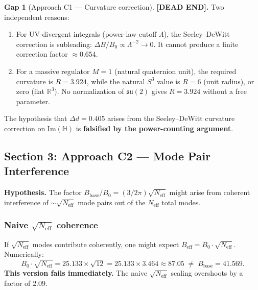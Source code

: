 \documentclass[11pt,a4paper]{article}
\theoremstyle{definition}
\newtheorem{gap}{Gap}
\theoremstyle{remark}
\begin{document}
\begin{gap}[Approach C1 — Curvature correction]
\label{gap:C1}
  \textbf{[DEAD END].}
  Two independent reasons:
  \begin{enumerate}
    \item[(i)] For UV-divergent integrals (power-law cutoff $\Lambda$), the
      Seeley--DeWitt correction is subleading: $\Delta B / B_0 \propto \Lambda^{-2} \to 0$.
      It cannot produce a finite correction factor $\approx 0.654$.
    \item[(ii)] For a massive regulator $M = 1$ (natural quaternion unit),
      the required curvature is $R = 3.924$,
      while the natural $S^3$ value is $R = 6$ (unit radius),
      or zero (flat $\mathbb{R}^3$).
      No normalization of $\mathfrak{su}(2)$ gives $R = 3.924$ without a free parameter.
  \end{enumerate}
  The hypothesis that $\Delta d = 0.405$ arises from the Seeley--DeWitt curvature
  correction on $\mathrm{Im}(\mathbb{H})$ is \textbf{falsified by the power-counting argument}.
\end{gap}

\subsection{Section 3: Approach C2 — Mode Pair Interference}
\label{sec:C2_interference}

\textbf{Hypothesis.}
The factor $B_{\mathrm{base}}/B_0 = (3/2\pi)\sqrt{N_{\mathrm{eff}}}$
might arise from coherent interference of $\sim\!\sqrt{N_{\mathrm{eff}}}$ mode pairs
out of the $N_{\mathrm{eff}}$ total modes.

\subsubsection{Naive $\sqrt{N_{\mathrm{eff}}}$ coherence}

If $\sqrt{N_{\mathrm{eff}}}$ modes contribute coherently, one might expect
$B_{\mathrm{eff}} = B_0 \cdot \sqrt{N_{\mathrm{eff}}}$.
Numerically:
\begin{equation}
  B_0 \cdot \sqrt{N_{\mathrm{eff}}} = 25.133 \times \sqrt{12} = 25.133 \times 3.464 \approx 87.05
  \;\ne\; B_{\mathrm{base}} = 41.569.
  \label{eq:naive_sqrt_fails}
\end{equation}
\textbf{This version fails immediately.}
The naive $\sqrt{N_{\mathrm{eff}}}$ scaling overshoots by a factor of $2.09$.
\end{document}
